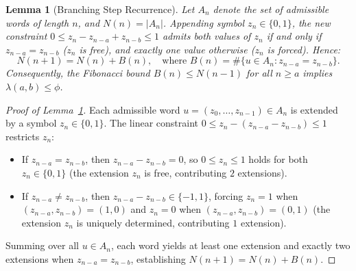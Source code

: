 \documentclass[11pt,reqno]{amsart}
\theoremstyle{plain}
\newtheorem{lemma}[theorem]{Lemma}
\theoremstyle{definition}
\theoremstyle{remark}
\begin{document}
\begin{lemma}[Branching Step Recurrence]\label{lem:branching_step}
Let $A_n$ denote the set of admissible words of length $n$, and $N(n) = |A_n|$. Appending symbol $z_n \in \{0, 1\}$, the new constraint $0 \le z_n - z_{n-a} + z_{n-b} \le 1$ admits both values of $z_n$ if and only if $z_{n-a} = z_{n-b}$ ($z_n$ is free), and exactly one value otherwise ($z_n$ is forced). Hence:
\begin{equation}
N(n+1) = N(n) + B(n), \quad \text{where } B(n) = \# \{ u \in A_n : z_{n-a} = z_{n-b} \}.
\end{equation}
Consequently, the Fibonacci bound $B(n) \le N(n-1)$ for all $n \ge a$ implies $\lambda(a, b) \le \phi$.
\end{lemma}

\begin{proof}[Proof of Lemma~\ref{lem:branching_step}]
Each admissible word $u = (z_0, \dots, z_{n-1}) \in A_n$ is extended by a symbol $z_n \in \{0, 1\}$. The linear constraint $0 \le z_n - (z_{n-a} - z_{n-b}) \le 1$ restricts $z_n$:
\begin{itemize}\setlength{\itemsep}{0pt}
    \item If $z_{n-a} = z_{n-b}$, then $z_{n-a} - z_{n-b} = 0$, so $0 \le z_n \le 1$ holds for both $z_n \in \{0, 1\}$ (the extension $z_n$ is free, contributing $2$ extensions).
    \item If $z_{n-a} \ne z_{n-b}$, then $z_{n-a} - z_{n-b} \in \{-1, 1\}$, forcing $z_n = 1$ when $(z_{n-a}, z_{n-b}) = (1, 0)$ and $z_n = 0$ when $(z_{n-a}, z_{n-b}) = (0, 1)$ (the extension $z_n$ is uniquely determined, contributing $1$ extension).
\end{itemize}
Summing over all $u \in A_n$, each word yields at least one extension and exactly two extensions when $z_{n-a} = z_{n-b}$, establishing $N(n+1) = N(n) + B(n)$.
\end{proof}
\end{document}
